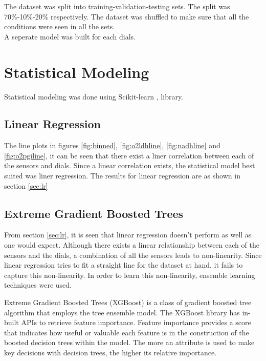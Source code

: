 \documentclass[12pt,chapterheads]{ucsd}
\begin{document}
The dataset was split into training-validation-testing sets. The split was 70\%-10\%-20\% respectively. The dataset was shuffled to make sure that all the conditions were seen in all the sets. \\
A seperate model was built for each dials. 

\section{Statistical Modeling}
    Statistical modeling was done using Scikit-learn \cite{scikit-learn}, \cite{sklearn_api} library.
\subsection{Linear Regression}
The line plots in figures \ref{fig:binned}, \ref{fig:o2ldhline}, \ref{fig:nadhline} and \ref{fig:o2pgiline}, it can be seen that there exist a liner correlation between each of the sensors and dials. Since a linear correlation exists, the statistical model best suited was liner regression. The results for linear regression are as shown in section \ref{sec:lr}

\subsection{Extreme Gradient Boosted Trees}\label{sec:xgboost}
From section \ref{sec:lr}, it is seen that linear regression doesn't perform as well as one would expect. Although there exists a linear relationship between each of the sensors and the dials, a combination of all the sensors leads to non-linearity. Since linear regression tries to fit a straight line for the dataset at hand, it fails to capture this non-linearity. In order to learn this non-linearity, ensemble learning techniques were used.

Extreme Gradient Boosted Trees \string(XGBoost) \cite{Chen:2016:XST:2939672.2939785} is a class of gradient boosted tree algorithm that employs the tree ensemble model.
The XGBoost library has in-built APIs to retrieve feature importance. Feature importance provides a score that indicates how useful or valuable each feature is in the construction of the boosted decision trees within the model. The more an attribute is used to make key decisions with decision trees, the higher its relative importance.
\end{document}
